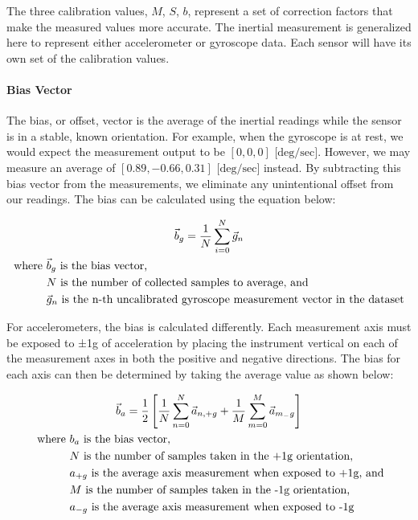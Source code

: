 The three calibration values, $M$, $S$, $b$, represent a set of correction factors that make the measured values more accurate. The inertial measurement is generalized here to represent either accelerometer or gyroscope data. Each sensor will have its own set of the calibration values.

\paragraph*{Bias Vector} The bias, or offset, vector is the average of the inertial readings while the sensor is in a stable, known orientation. For example, when the gyroscope is at rest, we would expect the measurement output to be $[0,0,0] \text{ [deg/sec]}$. However, we may measure an average of $[0.89, -0.66, 0.31] \text{ [deg/sec]}$ instead. By subtracting this bias vector from the measurements, we eliminate any unintentional offset from our readings. The bias can be calculated using the equation below:

\begin{gather}
    \vec{b}_g = \frac{1}{N} \sum_{i=0}^N{\vec{g}_n} \\
    \begin{aligned}
        \text{where } & \vec{b}_g \text{ is the bias vector,} \\
        & N \text{ is the number of collected samples to average, and} \\
        & \vec{g}_n \text{ is the n-th uncalibrated gyroscope measurement vector in the dataset}
    \end{aligned} \notag
\end{gather}

For accelerometers, the bias is calculated differently. Each measurement axis must be exposed to ±1g of acceleration by placing the instrument vertical on each of the measurement axes in both the positive and negative directions. The bias for each axis can then be determined by taking the average value as shown below:

\begin{gather}
    \vec{b}_a = \frac{1}{2} \left[ \frac{1}{N}\sum_{n=0}^N{\vec{a}_{n,+g}} + \frac{1}{M}\sum_{m=0}^M{\vec{a}_{m_-g}} \right] \\\
    \begin{aligned}
        \text{where } & b_a \text{ is the bias vector,} \\
        & N \text{ is the number of samples taken in the +1g orientation,} \\
        & a_{+g} \text{ is the average axis measurement when exposed to +1g, and}\\
        & M \text{ is the number of samples taken in the -1g orientation,} \\
        & a_{-g} \text{ is the average axis measurement when exposed to -1g}
    \end{aligned} \notag
\end{gather}

